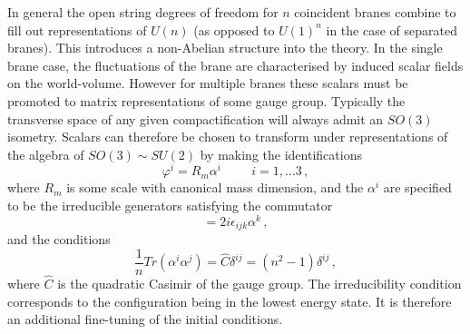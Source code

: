 In general the open string degrees of freedom for $n$ coincident branes 
combine to fill out representations of $U(n)$ (as opposed to $U(1)^n$ 
in the case of separated branes). This introduces a non-Abelian 
structure into the theory. In the single brane case, the fluctuations of the 
brane are characterised by induced scalar fields on the world-volume. 
However for multiple branes
these scalars must be promoted to matrix representations of some gauge group. 
% 
Typically the transverse space of any given compactification will always admit
an $SO(3)$ isometry. Scalars can therefore be chosen to 
transform under representations of the algebra of $SO(3) \sim SU(2)$ by making 
the identifications
% 
\begin{equation}
\varphi^i = R_m \alpha^i \hspace{1cm} i =1,  \ldots 3 \,,
\end{equation}
% 
where $R_m$ is some scale with canonical mass dimension, and the $\alpha^i$ are
specified to be the irreducible generators satisfying the commutator
% 
\begin{equation}
[\alpha^i, \alpha^j] = 2i \epsilon_{ijk} \alpha^k \,,
\end{equation}
% 
and the conditions
% 
\begin{equation}
\frac{1}{n} Tr(\alpha^i \alpha^j) = \hat{C} \delta^{ij} = (n^2-1) \delta^{ij}
\,,
\end{equation}
% 
where $\hat{C}$ is the quadratic Casimir of the gauge group.
The irreducibility condition corresponds to the configuration being in the
lowest energy state. It is therefore an additional fine-tuning
of the initial conditions. 


